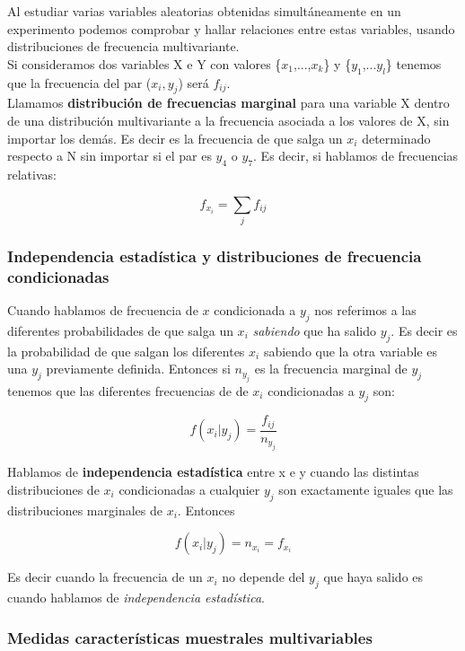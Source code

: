 \documentclass[12pt,a4paper]{book}
\begin{document}
Al estudiar varias variables aleatorias obtenidas simultáneamente en un experimento podemos comprobar y hallar relaciones entre estas variables, usando distribuciones de frecuencia multivariante. \\

Si consideramos dos variables X e Y con valores \{$x_1$,...,$x_k$\} y \{$y_1$,...$y_l$\} tenemos que la frecuencia del par ($x_i, y_j$) será $f_{ij}$. \\

Llamamos \textbf{distribución de frecuencias marginal} para una variable X dentro de una distribución multivariante a la frecuencia asociada a los valores de X, sin importar los demás. Es decir es la frecuencia de que salga un $x_i$ determinado respecto a N sin importar si el par es $y_4$ o $y_7$. Es decir, si hablamos de frecuencias relativas:  

$$ f_{x_i} = \sum_j f_{ij} $$

\subsubsection{Independencia estadística y distribuciones de frecuencia condicionadas}


Cuando hablamos de frecuencia de $x$ condicionada a $y_j$ nos referimos a las diferentes probabilidades de que salga un $x_i$ \textit{sabiendo} que ha salido $y_j$. Es decir es la probabilidad de que salgan los diferentes $x_i$ sabiendo que la otra variable es una $y_j$ previamente definida. Entonces si $n_{y_j}$ es la frecuencia marginal de $y_j$ tenemos que las diferentes frecuencias de de $x_i$ condicionadas a $y_j$ son:

\begin{equation}
f(x_i | y_j) = \dfrac{f_{ij}}{n_{y_j}}
\end{equation}

Hablamos de \textbf{independencia estadística} entre x e y cuando las distintas distribuciones de $x_i$ condicionadas a cualquier $y_j $ son exactamente iguales que las distribuciones marginales de $x_i$. Entonces 

$$ f(x_i | y_j) = n_{x_i} = f_{x_i} $$

Es decir cuando la frecuencia de un $x_i$ no depende del $y_j$ que haya salido es cuando hablamos de \textit{independencia estadística}. 

\subsubsection{Medidas características muestrales multivariables}
\end{document}
